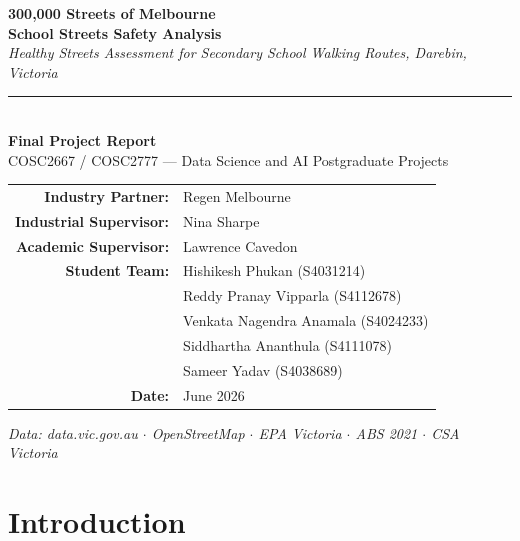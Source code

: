 \documentclass[11pt,a4paper]{article}
\begin{document}
\begin{titlepage}
\centering\vspace*{1.2cm}
{\Large\bfseries\color{regengreen}300,000 Streets of Melbourne}\\[0.4cm]
{\LARGE\bfseries School Streets Safety Analysis}\\[0.3cm]
{\large\itshape Healthy Streets Assessment for Secondary School Walking Routes, Darebin, Victoria}
\vspace{1cm}

\rule{0.6\textwidth}{1.5pt}\\[0.8cm]
{\large\bfseries Final Project Report}\\[0.3cm]
{\normalsize COSC2667 / COSC2777 — Data Science and AI Postgraduate Projects}
\vspace{1.2cm}

{\normalsize\begin{tabular}{rl}
\textbf{Industry Partner:}       & Regen Melbourne \\[0.3em]
\textbf{Industrial Supervisor:}  & Nina Sharpe \\[0.3em]
\textbf{Academic Supervisor:}    & Lawrence Cavedon \\[0.3em]
\textbf{Student Team:}           & Hishikesh Phukan (S4031214) \\
                                 & Reddy Pranay Vipparla (S4112678) \\
                                 & Venkata Nagendra Anamala (S4024233) \\
                                 & Siddhartha Ananthula (S4111078) \\
                                 & Sameer Yadav (S4038689) \\[0.3em]
\textbf{Date:}                   & June 2026 \\
\end{tabular}}
\vfill
{\small\itshape Data: data.vic.gov.au $\cdot$ OpenStreetMap $\cdot$ EPA Victoria $\cdot$ ABS 2021 $\cdot$ CSA Victoria}
\end{titlepage}

\section{Introduction}
\end{document}
